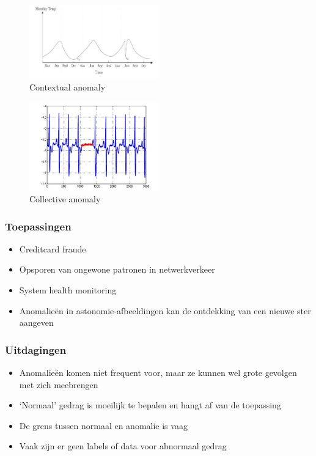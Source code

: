 \documentclass{article}
\begin{document}
\begin{figure}[H]
    \centering
    \includegraphics[width=0.5\textwidth]{anomaly-contextual.png}
    \caption{Contextual anomaly}
\end{figure}

\begin{figure}[H]
    \centering
    \includegraphics[width=0.5\textwidth]{anomaly-collective.png}
    \caption{Collective anomaly}
\end{figure}

\subsubsection{Toepassingen}

\begin{itemize}
    \item Creditcard fraude
    \item Opsporen van ongewone patronen in netwerkverkeer
    \item System health monitoring
    \item Anomalieën in astonomie-afbeeldingen kan de ontdekking van een nieuwe ster aangeven
\end{itemize}

\subsubsection{Uitdagingen}

\begin{itemize}
    \item Anomalieën komen niet frequent voor, maar ze kunnen wel grote gevolgen met zich meebrengen
    \item `Normaal' gedrag is moeilijk te bepalen en hangt af van de toepassing
    \item De grens tussen normaal en anomalie is vaag
    \item Vaak zijn er geen labels of data voor abnormaal gedrag
\end{itemize}
\end{document}
